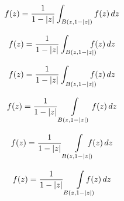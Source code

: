 \documentclass{article}
\DeclarePairedDelimiter{\abs}{\lvert}{\rvert}
\newcommand{\lowersub}{\smash[b]{\vphantom{\bigg|}}}
\begin{document}
\begin{gather}
f(z) = \frac{1}{1-\abs{z}} \int_{B(z,1-\lvert z\rvert)} f(z)\,dz \\[2ex]
f(z) = \frac{1}{1-\abs{z}} \int_{B(z,1-\lvert z\rvert)} \hspace{-1em} f(z)\,dz \\[2ex]
f(z) = \frac{1}{1-\abs{z}} \int_{\lowersub B(z,1-\lvert z\rvert)} \hspace{-1em} f(z)\,dz \\[2ex]
f(z) = \frac{1}{1-\abs{z}} \int\limits_{B(z,1-\lvert z\rvert)} f(z)\,dz \\[2ex]
f(z) = \frac{1}{1-\abs{z}} \int\limits_{B(z,1-\lvert z\rvert)} \hspace{-1em} f(z)\,dz \\[2ex]
f(z) = \frac{1}{1-\abs{z}} \smashoperator[r]{\int\limits_{B(z,1-\lvert z\rvert)}} f(z)\,dz
\end{gather}
\end{document}
